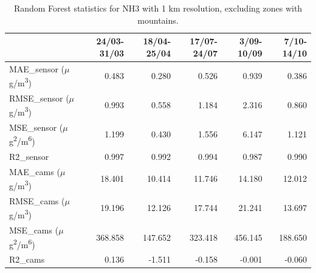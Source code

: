 \begin{table}[H]
\begin{tabular}{lrrrrr}
\toprule
 &  24/03-31/03 &  18/04-25/04 &  17/07-24/07 &  3/09-10/09 &  7/10-14/10 \\
\midrule
 MAE\_sensor ($\mu$g/m\textsuperscript{3})&        0.483 &        0.280 &        0.526 &       0.939 &       0.386 \\
RMSE\_sensor ($\mu$g/m\textsuperscript{3})&        0.993 &        0.558 &        1.184 &       2.316 &       0.860 \\
 MSE\_sensor ($\mu$g\textsuperscript{2}/m\textsuperscript{6})&        1.199 &        0.430 &        1.556 &       6.147 &       1.121 \\
  R2\_sensor &        0.997 &        0.992 &        0.994 &       0.987 &       0.990 \\
   MAE\_cams ($\mu$g/m\textsuperscript{3})&       18.401 &       10.414 &       11.746 &      14.180 &      12.012 \\
  RMSE\_cams ($\mu$g/m\textsuperscript{3})&       19.196 &       12.126 &       17.744 &      21.241 &      13.697 \\
   MSE\_cams ($\mu$g\textsuperscript{2}/m\textsuperscript{6})&      368.858 &      147.652 &      323.418 &     456.145 &     188.650 \\
    R2\_cams &        0.136 &       -1.511 &       -0.158 &      -0.001 &      -0.060 \\
\bottomrule
\end{tabular}
\caption{Random Forest statistics for NH3 with 1 km resolution, excluding zones with mountains.}
\end{table}
